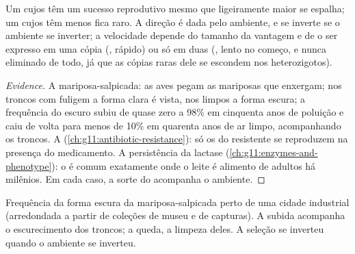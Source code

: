 \begin{proposition}\label{prop:g12:selection-drift-speciation:direction}
Um  cujos  têm um sucesso reprodutivo mesmo que
ligeiramente maior se espalha; um cujos  têm menos fica raro.
A direção é dada pelo ambiente, e se inverte se o ambiente se inverter;
a velocidade depende do tamanho da vantagem e de o  ser expresso
em uma cópia (, rápido) ou só em duas (, lento no
começo, e nunca eliminado de todo, já que as cópias raras dele se
escondem nos heterozigotos).
\end{proposition}
\begin{proof}[Evidence]
A mariposa-salpicada: as aves pegam as mariposas que enxergam; nos
troncos com fuligem a forma clara é vista, nos limpos a forma escura; a
frequência do  escuro subiu de quase zero a 98\% em cinquenta anos
de poluição e caiu de volta para menos de 10\% em quarenta anos de ar
limpo, acompanhando os troncos. A 
(\cref{ch:g11:antibiotic-resistance}): só os  do 
resistente se reproduzem na presença do medicamento. A persistência da
lactase (\cref{ch:g11:enzymes-and-phenotype}): o  é comum
exatamente onde o leite é alimento de adultos há milênios. Em cada
caso, a sorte do  acompanha o ambiente.
\end{proof}

\begin{omfigure}

{\small Frequência da forma escura da mariposa-salpicada perto de uma
cidade industrial (arredondada a partir de coleções de museu e de
capturas). A subida acompanha o escurecimento dos troncos; a queda, a
limpeza deles. A seleção se inverteu quando o ambiente se inverteu.}
\end{omfigure}

